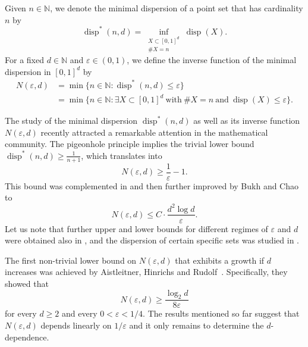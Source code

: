 \documentclass[11pt]{article}
\newcommand{\eps}{\varepsilon}
\newcommand{\Nat}{\mathbb{N}}
\DeclareMathOperator\disp{disp}
\begin{document}
Given $n \in \Nat$, we denote the minimal dispersion of a point set that has cardinality $n$ by
\[
\disp^*(n,d)=\inf_{\substack{X\subset [0,1]^d\\\#X=n}}\disp(X).
\]
For a fixed $d \in \Nat$ and $\eps\in(0,1)$, we define the inverse function of the minimal dispersion in $[0,1]^d$ by
\begin{align*}
N(\varepsilon,d)&=\min\{n\in\Nat: \disp^*(n,d)\le \varepsilon\}\\
&=\min\{n\in\Nat: \exists X\subset [0,1]^d\ \text{with}\ \#X=n\ \text{and}\ \disp(X)\le\varepsilon\}
.
\end{align*}

The study of the minimal dispersion $\disp^*(n,d)$ as well as its inverse function $N(\varepsilon,d)$
recently attracted a remarkable attention in the mathematical community.
The pigeonhole principle implies the trivial lower bound  $\disp^*(n,d)\ge \frac{1}{n+1}$,
which translates into \[N(\varepsilon,d)\ge \frac1\varepsilon-1.\]
This bound was complemented in \cite{RT96} and then further improved by Bukh and Chao~\cite{BC} to
\begin{equation}\label{eq:BC}
N(\varepsilon,d)\le C \cdot \frac{d^2\log d}{\varepsilon}.
\end{equation}
Let us note that further upper and lower bounds for different regimes of $\varepsilon$ and $d$ were obtained also in \cite{Dum, Lit, LL, Mac, Rudolf},
and the dispersion of certain specific sets was studied in \cite{BH, HKKR, Krieg, Kritz, LW, Teml,Mario}.

The first non-trivial lower bound on $N(\varepsilon,d)$ that exhibits a growth if $d$ increases was achieved by Aistleitner, Hinrichs and Rudolf~\cite{AHR}.
Specifically, they showed that
\begin{equation}\label{eq:AHR}
N(\varepsilon,d)\ge \frac{\log_2 d}{8\varepsilon}
\end{equation}
for every $d\ge 2$ and every $0<\varepsilon<1/4.$
The results mentioned so far suggest that $N(\varepsilon,d)$ depends linearly on $1/\varepsilon$ and it only remains to determine the $d$-dependence.
\end{document}
